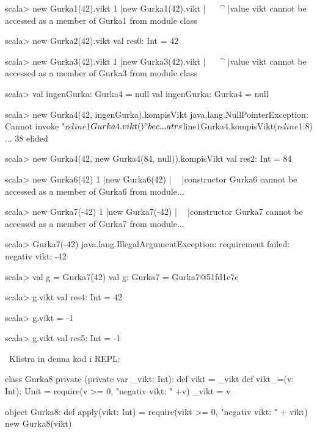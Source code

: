 \SubtaskSolved
\begin{REPL}
scala> new Gurka1(42).vikt
1 |new Gurka1(42).vikt
  |^^^^^^^^^^^^^^^^^^^
  |value vikt cannot be accessed as a member of Gurka1 from module class

scala> new Gurka2(42).vikt
val res0: Int = 42

scala> new Gurka3(42).vikt
1 |new Gurka3(42).vikt
  |^^^^^^^^^^^^^^^^^^^
  |value vikt cannot be accessed as a member of Gurka3 from module class

scala> val ingenGurka: Gurka4 = null
val ingenGurka: Gurka4 = null

scala> new Gurka4(42, ingenGurka).kompisVikt
java.lang.NullPointerException: Cannot invoke "rs$line$1$Gurka4.vikt()" bec...
  at rs$line$1$Gurka4.kompisVikt(rs$line$1:8)
  ... 38 elided

scala> new Gurka4(42, new Gurka4(84, null)).kompisVikt
val res2: Int = 84

scala> new Gurka6(42)
1 |new Gurka6(42)
  |    ^^^^^^
  |constructor Gurka6 cannot be accessed as a member of Gurka6 from module...

scala> new Gurka7(-42)
1 |new Gurka7(-42)
  |    ^^^^^^
  |constructor Gurka7 cannot be accessed as a member of Gurka7 from module...

scala> Gurka7(-42)
java.lang.IllegalArgumentException: requirement failed: negativ vikt: -42

scala> val g = Gurka7(42)
val g: Gurka7 = Gurka7@51fd1c7c

scala> g.vikt
val res4: Int = 42

scala> g.vikt = -1

scala> g.vikt
val res5: Int = -1
\end{REPL}

\QUESTEND






\QUESTBEGIN

\Task  \what~Klistra in denna kod i REPL:

\begin{Code}
class Gurka8 private (private var _vikt: Int):
  def vikt = _vikt
  def vikt_=(v: Int): Unit =
    require(v >= 0, "negativ vikt: " +v)
    _vikt = v

object Gurka8:
  def apply(vikt: Int) =
    require(vikt >= 0, "negativ vikt: " + vikt)
    new Gurka8(vikt)
\end{Code}


